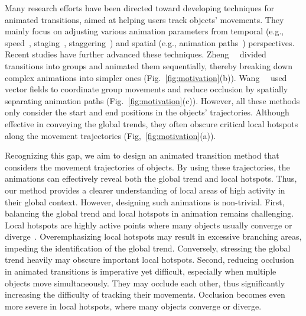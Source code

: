 Many research efforts have been directed toward developing techniques for animated transitions, aimed at helping users track objects' movements.
They mainly focus on adjusting various animation parameters from temporal (e.g., speed~\cite{dragicevic2011distortion}, staging~\cite{heer2007animated}, staggering~\cite{chevalier2014not}) and spatial (e.g., animation paths~\cite{du2015trajectory,wang2017vector}) perspectives.
Recent studies have further advanced these techniques.
Zheng~\etal~\cite{zheng2018focus+} divided transitions into groups and animated them sequentially, thereby breaking down complex animations into simpler ones (Fig.~\ref{fig:motivation}(b)).
Wang~\etal~\cite{wang2017vector} used vector fields to coordinate group movements and reduce occlusion by spatially separating animation paths (Fig.~\ref{fig:motivation}(c)).
However, all these methods only consider the start and end positions in the objects' trajectories.
Although effective in conveying the global trends, they often obscure critical local hotspots along the movement trajectories (Fig,~\ref{fig:motivation}(a)).

Recognizing this gap, we aim to design an animated transition method that considers the movement trajectories of objects.
By using these trajectories, the animations can effectively reveal both the global trend and local hotspots.
Thus, our method provides a clearer understanding of local areas of high activity in their global context.
However, designing such animations is non-trivial. 
First, balancing the global trend and local hotspots in animation remains challenging. 
Local hotspots are highly active points where many objects usually converge or diverge~\cite{deng2018road, li2023vectortrajectory, tao2017hotspot}.
Overemphasizing local hotspots may result in excessive branching areas, impeding the identification of the global trend.
Conversely, stressing the global trend heavily may obscure important local hotspots.
Second, reducing occlusion in animated transitions is imperative yet difficult, especially when multiple objects move simultaneously. 
They may occlude each other, thus significantly increasing the difficulty of tracking their movements.
Occlusion becomes even more severe in local hotspots, where many objects converge or diverge. 


